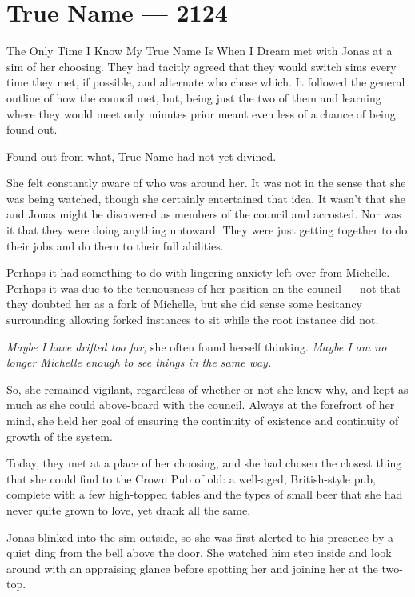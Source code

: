 \hypertarget{true-name-2124}{%
\chapter{True Name — 2124}\label{true-name-2124}}

The Only Time I Know My True Name Is When I Dream met with Jonas at a sim of her choosing. They had tacitly agreed that they would switch sims every time they met, if possible, and alternate who chose which. It followed the general outline of how the council met, but, being just the two of them and learning where they would meet only minutes prior meant even less of a chance of being found out.

Found out from what, True Name had not yet divined.

She felt constantly aware of who was around her. It was not in the sense that she was being watched, though she certainly entertained that idea. It wasn't that she and Jonas might be discovered as members of the council and accosted. Nor was it that they were doing anything untoward. They were just getting together to do their jobs and do them to their full abilities.

Perhaps it had something to do with lingering anxiety left over from Michelle. Perhaps it was due to the tenuousness of her position on the council — not that they doubted her as a fork of Michelle, but she did sense some hesitancy surrounding allowing forked instances to sit while the root instance did not.

\emph{Maybe I have drifted too far,} she often found herself thinking. \emph{Maybe I am no longer Michelle enough to see things in the same way.}

So, she remained vigilant, regardless of whether or not she knew why, and kept as much as she could above-board with the council. Always at the forefront of her mind, she held her goal of ensuring the continuity of existence and continuity of growth of the system.

Today, they met at a place of her choosing, and she had chosen the closest thing that she could find to the Crown Pub of old: a well-aged, British-style pub, complete with a few high-topped tables and the types of small beer that she had never quite grown to love, yet drank all the same.

Jonas blinked into the sim outside, so she was first alerted to his presence by a quiet ding from the bell above the door. She watched him step inside and look around with an appraising glance before spotting her and joining her at the two-top.

